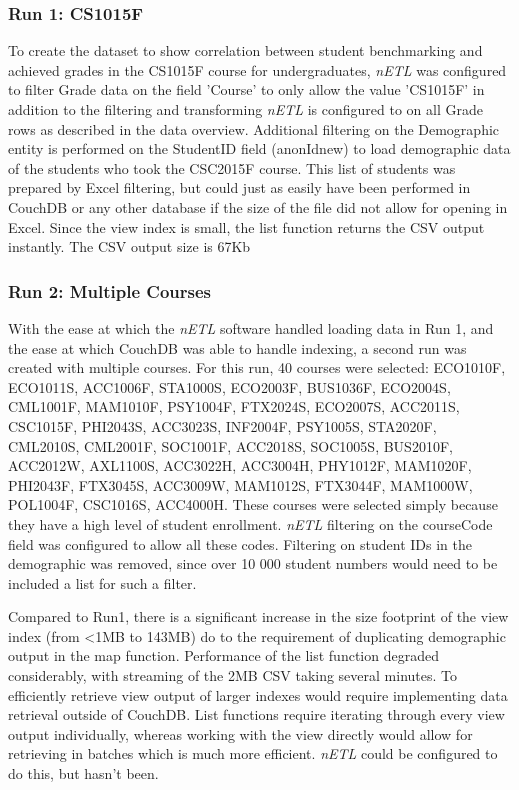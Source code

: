 \subsubsection{Run 1: CS1015F}
To create the dataset to show correlation between student benchmarking and achieved grades in the CS1015F course for undergraduates, \textit{nETL} was configured to filter Grade data on the field 'Course' to only allow the value 'CS1015F' in addition to the filtering and transforming \textit{nETL} is configured to on all Grade rows as described in the data overview. Additional filtering on the Demographic entity is performed on the StudentID field (anonIdnew) to load demographic data of the students who took the CSC2015F course. This list of students was prepared by Excel filtering, but could just as easily have been performed in CouchDB or any other database if the size of the file did not allow for opening in Excel. Since the view index is small, the list function returns the CSV output instantly. The CSV output size is 67Kb

\subsubsection{Run 2: Multiple Courses}
With the ease at which the \textit{nETL} software handled loading data in Run 1, and the ease at which CouchDB was able to handle indexing, a second run was created with multiple courses. For this run, 40 courses were selected: ECO1010F, ECO1011S, ACC1006F, STA1000S, ECO2003F, BUS1036F, ECO2004S, CML1001F, MAM1010F, PSY1004F, FTX2024S, ECO2007S, ACC2011S, CSC1015F, PHI2043S, ACC3023S, INF2004F, PSY1005S, STA2020F, CML2010S, CML2001F, SOC1001F, ACC2018S, SOC1005S, BUS2010F, ACC2012W, AXL1100S, ACC3022H, ACC3004H, PHY1012F, MAM1020F, PHI2043F, FTX3045S, ACC3009W, MAM1012S, FTX3044F, MAM1000W, POL1004F, CSC1016S, ACC4000H. These courses were selected simply because they have a high level of student enrollment. \textit{nETL} filtering on the courseCode field was configured to allow all these codes. Filtering on student IDs in the demographic was removed, since over 10 000 student numbers would need to be included a list for such a filter.

Compared to Run1, there is a significant increase in the size footprint of the view index (from \textless 1MB to 143MB) do to the requirement of duplicating demographic output in the map function. Performance of the list function degraded considerably, with streaming of the 2MB CSV taking several minutes. To efficiently retrieve view output of larger indexes would require implementing data retrieval outside of CouchDB. List functions require iterating through every view output individually, whereas working with the view directly would allow for retrieving in batches which is much more efficient. \textit{nETL} could be configured to do this, but hasn't been.

